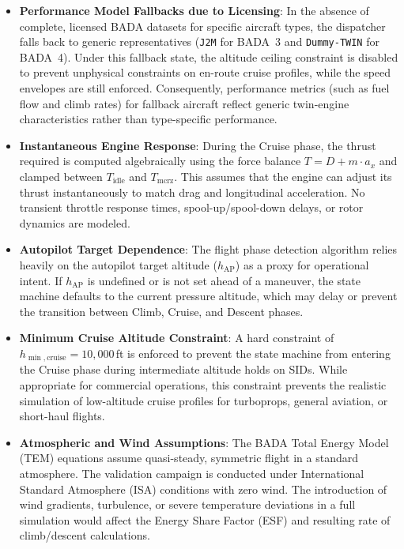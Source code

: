 \begin{itemize}
    \item \textbf{Performance Model Fallbacks due to Licensing}: In the absence of complete, licensed BADA datasets for specific aircraft types, the dispatcher falls back to generic representatives (\texttt{J2M} for BADA~3 and \texttt{Dummy-TWIN} for BADA~4). Under this fallback state, the altitude ceiling constraint is disabled to prevent unphysical constraints on en-route cruise profiles, while the speed envelopes are still enforced. Consequently, performance metrics (such as fuel flow and climb rates) for fallback aircraft reflect generic twin-engine characteristics rather than type-specific performance.
    
    \item \textbf{Instantaneous Engine Response}: During the Cruise phase, the thrust required is computed algebraically using the force balance $T = D + m \cdot a_x$ and clamped between $T_{\text{idle}}$ and $T_{\text{mcrz}}$. This assumes that the engine can adjust its thrust instantaneously to match drag and longitudinal acceleration. No transient throttle response times, spool-up/spool-down delays, or rotor dynamics are modeled.
    
    \item \textbf{Autopilot Target Dependence}: The flight phase detection algorithm relies heavily on the autopilot target altitude ($h_{\text{AP}}$) as a proxy for operational intent. If $h_{\text{AP}}$ is undefined or is not set ahead of a maneuver, the state machine defaults to the current pressure altitude, which may delay or prevent the transition between Climb, Cruise, and Descent phases.
    
    \item \textbf{Minimum Cruise Altitude Constraint}: A hard constraint of $h_{\min,\text{cruise}} = 10{,}000$\,ft is enforced to prevent the state machine from entering the Cruise phase during intermediate altitude holds on SIDs. While appropriate for commercial operations, this constraint prevents the realistic simulation of low-altitude cruise profiles for turboprops, general aviation, or short-haul flights.
    
    \item \textbf{Atmospheric and Wind Assumptions}: The BADA Total Energy Model (TEM) equations assume quasi-steady, symmetric flight in a standard atmosphere. The validation campaign is conducted under International Standard Atmosphere (ISA) conditions with zero wind. The introduction of wind gradients, turbulence, or severe temperature deviations in a full simulation would affect the Energy Share Factor (ESF) and resulting rate of climb/descent calculations.
    

\end{itemize}
